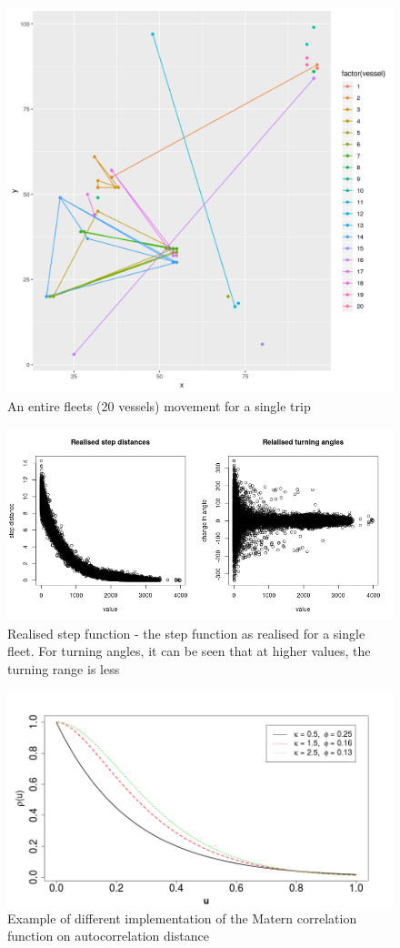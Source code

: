 \documentclass[review]{elsarticle}
\begin{document}
\begin{figure}[!ht]
	\includegraphics[width = \linewidth]{Plots/fleet_moves}
	\caption{An entire fleets (20 vessels) movement for a single trip}
	\label{fig:14}
\end{figure}	

\begin{figure}[!ht]
	\includegraphics[width = \linewidth]{../tests/plots/step_function}
	\caption{Realised step function - the step function as realised for a
		single fleet. For turning angles, it can be seen that at higher
	values, the turning range is less}
	\label{fig:15}
\end{figure}	

\begin{figure}[!ht]
	\includegraphics[width = \linewidth]{./Plots/Matern}
	\caption{Example of different implementation of the Matern correlation
	function on autocorrelation distance}
	\label{fig:16}
\end{figure}	
\end{document}

